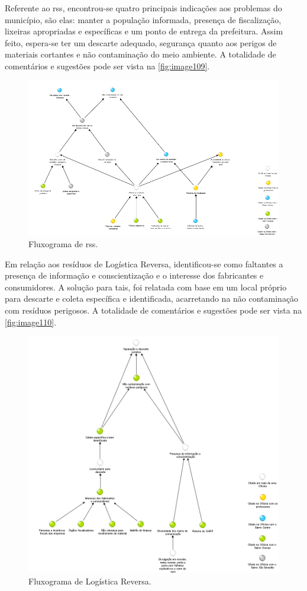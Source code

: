 Referente ao \gls{rss}, encontrou-se quatro principais indicações aos problemas do município, são elas: manter a população informada, presença de fiscalização, lixeiras apropriadas e específicas e um ponto de entrega da prefeitura. Assim feito, espera-se ter um descarte adequado, segurança quanto aos perigos de materiais cortantes e não contaminação do meio ambiente. A totalidade de comentários e sugestões pode ser vista na \autoref{fig:image109}.

\begin{figure}
	\centering
	\includegraphics[width=0.75\linewidth]{produtos/prodtres/image109}
	\caption{Fluxograma de \gls{rss}.}
	\label{fig:image109}
\end{figure}

Em relação aos resíduos de Logística Reversa, identificou-se como faltantes a presença de informação e conscientização e o interesse dos fabricantes e consumidores. A solução para tais, foi relatada com base em um local próprio para descarte e coleta específica e identificada, acarretando na não contaminação com resíduos perigosos. A totalidade de comentários e sugestões pode ser vista na \autoref{fig:image110}.

\begin{figure}
	\centering
	\includegraphics[width=0.75\linewidth]{produtos/prodtres/image110}
	\caption{Fluxograma de Logística Reversa.}
	\label{fig:image110}
\end{figure}

